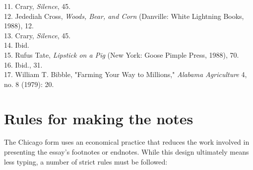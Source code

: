 \begin{tcolorbox}[enhanced,width=4.2in,left=.3in, right=.3in,
   drop fuzzy shadow southeast,
    boxrule=0.4pt,sharp corners,colframe=black!80!black,colback=white!10]
{\begin{singlespacing}
\hspace{2em}11. Crary, \emph{Silence}, 45.\\

\hspace{2em}12. Jedediah Cross, \emph{Woods, Bear, and Corn} (Danville: White Lightning Books, 1988), 12.\\

\hspace{2em}13. Crary, \emph{Silence}, 45.\\

\hspace{2em}14. Ibid.\\

\hspace{2em}15. Rufus Tate, \emph{Lipstick on a Pig} (New York: Goose Pimple Press, 1988), 70.\\

\hspace{2em}16. Ibid., 31.\\

\hspace{2em}17. William T. Bibble, "Farming Your Way to Millions," \emph{Alabama Agriculture} 4, no. 8 (1979): 20.\\


\end{singlespacing}
}
\bigskip


\end{tcolorbox}

\newpage

\section{Rules for making the notes} The Chicago form uses an economical
practice that reduces the  work involved in presenting the essay's footnotes or
endnotes. While this design  ultimately means less typing, a number of strict
rules must be followed:

